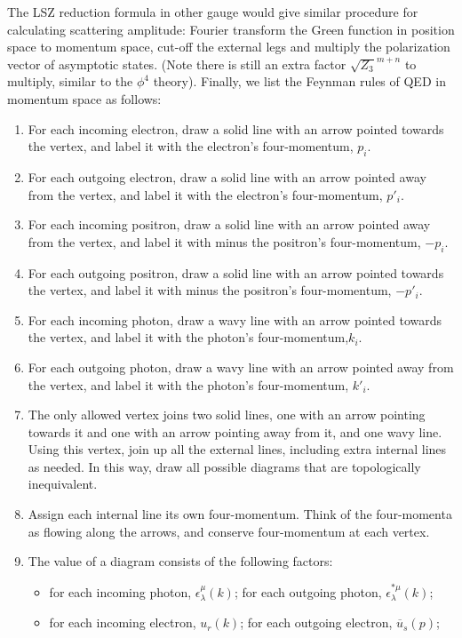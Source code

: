 \noindent
The LSZ reduction formula in other gauge would give similar procedure for calculating scattering amplitude: Fourier transform the Green function in position space to momentum space, cut-off the external legs and multiply the polarization vector of asymptotic states. (Note there is still an extra factor $\sqrt{Z_3}^{m+n}$ to multiply, similar to the $\phi^4$ theory).
Finally, we list the Feynman rules of QED in momentum space as follows:
\begin{enumerate}
\item For each incoming electron, draw a solid line with an arrow pointed towards the vertex, and label it with the electron's four-momentum, $p_i$.
\item For each outgoing electron, draw a solid line with an arrow pointed away from the vertex, and label it with the electron's four-momentum, $p'_i$.
\item For each incoming positron, draw a solid line with an arrow pointed away from the vertex, and label it with minus the positron's four-momentum, $-p_i$.
\item For each outgoing positron, draw a solid line with an arrow pointed towards the vertex, and label it with minus the positron's four-momentum, $-p'_i$.
\item For each incoming photon, draw a wavy line with an arrow pointed towards the vertex, and label it with the photon's four-momentum,$k_i$.
\item For each outgoing photon, draw a wavy line with an arrow pointed away from the vertex, and label it with the photon's four-momentum, $k'_i$.
\item The only allowed vertex joins two solid lines, one with an arrow pointing towards it and one with an arrow pointing away from it, and one wavy line. Using this vertex, join up all the external lines, including extra internal lines as needed. In this way, draw all possible diagrams that are topologically inequivalent.
\item Assign each internal line its own four-momentum. Think of the four-momenta as flowing along the arrows, and conserve four-momentum at each vertex. 
\item The value of a diagram consists of the following factors:
\begin{itemize}
\item for each incoming photon, $\epsilon^{\mu}_{\lambda}(k)$; 
for each outgoing photon, $\epsilon^{*\mu}_{\lambda}(k)$;
\item for each incoming electron, $u_{r}(k)$; for each outgoing electron, $\overline{u}_{s}(p)$;

\end{itemize}
\end{enumerate}
